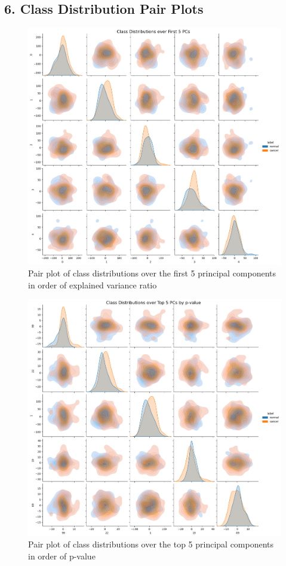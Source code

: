 \documentclass[twocolumn]{article}
\begin{document}
\subsection{6. Class Distribution Pair Plots}
\begin{figure}[H]
    \centering
    \includegraphics[width=0.85\linewidth]{figures/PairPlot_PCA.png}
    \caption{Pair plot of class distributions over the first 5 principal components in order of explained variance ratio}
    \label{fig:pp-pca}
\end{figure}

\begin{figure}[H]
    \centering
    \includegraphics[width=0.85\linewidth]{figures/PairPlot_PCA_Significant.png}
    \caption{Pair plot of class distributions over the top 5 principal components in order of p-value}
    \label{fig:pp-pca-significant}
\end{figure}
\end{document}
